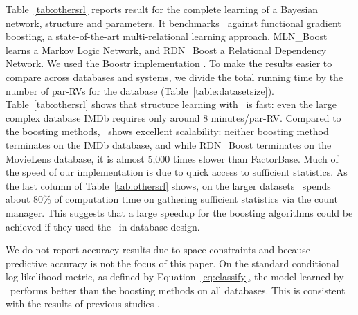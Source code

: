 \documentclass{IEEEtran}
\begin{document}
Table~\ref{tab:othersrl} reports result for the complete learning of a Bayesian network, structure and parameters. It benchmarks \FB\ against functional gradient boosting, a state-of-the-art  multi-relational learning approach.
MLN\_Boost learns a Markov Logic Network, and RDN\_Boost a Relational Dependency Network. 
We used the Boostr implementation \cite{Khot2013}. 
To make the results easier to compare across databases and systems, we divide the total running time by the number of par-RVs for the database (Table~\ref{table:datasetsize}). 
Table~\ref{tab:othersrl} shows that structure learning with \FB\ is fast: even the large complex database IMDb requires only around 8 minutes/par-RV. Compared to the boosting methods, \FB\ shows excellent scalability: neither boosting method terminates on the IMDb database, and while RDN\_Boost terminates on the MovieLens database, it is almost 5,000 times slower than {\sc FactorBase}. 
Much of the speed of our implementation is due to quick access to sufficient statistics. As the last column of Table~\ref{tab:othersrl} shows, on the larger datasets \FB\ spends about 80\% of computation time on gathering sufficient statistics via the count manager. This suggests that a large  speedup for the boosting algorithms could be achieved if they used the \FB\ in-database design. 

We do not report accuracy results due to space constraints and because predictive accuracy is not the focus of this paper. On the standard conditional log-likelihood metric, as defined by Equation~\ref{eq:classify}, the model learned by \FB\ performs better than the boosting methods on all databases. This is consistent with the results of previous studies \cite{Schulte2012}.

\begin{table}[htbp] \caption{Learning Time Comparison (sec) with other statistical-relational learning systems. NT = non-termination}
  \centering
  \label{tab:othersrl}%
\end{table}%
\end{document}
